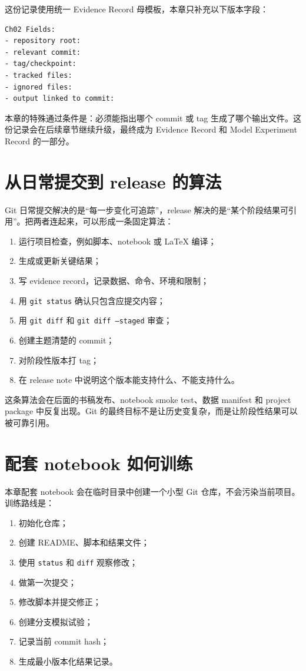 这份记录使用统一 Evidence Record 母模板，本章只补充以下版本字段：

\begin{examplebox}
\begin{lstlisting}[style=terminal]
Ch02 Fields:
- repository root:
- relevant commit:
- tag/checkpoint:
- tracked files:
- ignored files:
- output linked to commit:
\end{lstlisting}
\end{examplebox}

本章的特殊通过条件是：必须能指出哪个 commit 或 tag 生成了哪个输出文件。这份记录会在后续章节继续升级，最终成为 Evidence Record 和 Model Experiment Record 的一部分。

\section{从日常提交到 release 的算法}

Git 日常提交解决的是“每一步变化可追踪”，release 解决的是“某个阶段结果可引用”。把两者连起来，可以形成一条固定算法：

\begin{enumerate}
    \item 运行项目检查，例如脚本、notebook 或 LaTeX 编译；
    \item 生成或更新关键结果；
    \item 写 evidence record，记录数据、命令、环境和限制；
    \item 用 \texttt{git status} 确认只包含应提交内容；
    \item 用 \texttt{git diff} 和 \texttt{git diff --staged} 审查；
    \item 创建主题清楚的 commit；
    \item 对阶段性版本打 tag；
    \item 在 release note 中说明这个版本能支持什么、不能支持什么。
\end{enumerate}

这条算法会在后面的书稿发布、notebook smoke test、数据 manifest 和 project package 中反复出现。Git 的最终目标不是让历史变复杂，而是让阶段性结果可以被可靠引用。

\section{配套 notebook 如何训练}

本章配套 notebook 会在临时目录中创建一个小型 Git 仓库，不会污染当前项目。训练路线是：

\begin{enumerate}
    \item 初始化仓库；
    \item 创建 README、脚本和结果文件；
    \item 使用 \texttt{status} 和 \texttt{diff} 观察修改；
    \item 做第一次提交；
    \item 修改脚本并提交修正；
    \item 创建分支模拟试验；
    \item 记录当前 commit hash；
    \item 生成最小版本化结果记录。
\end{enumerate}

